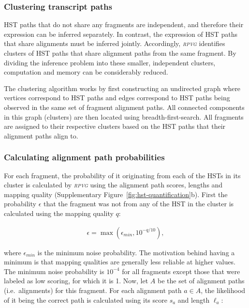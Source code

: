 \documentclass[11pt]{ucthesis}
\newcommand{\tool}[1]{\emph{\textsc{#1}}}
\begin{document}
\subsubsection{Clustering transcript paths}

HST paths that do not share any fragments are independent, and therefore their expression can be inferred separately. In contrast, the expression of HST paths that share alignments must be inferred jointly. Accordingly, \tool{rpvg} identifies clusters of HST paths that share alignment paths from the same fragment. By dividing the inference problem into these smaller, independent clusters, computation and memory can be considerably reduced. 

The clustering algorithm works by first constructing an undirected graph where vertices correspond to HST paths and edges correspond to HST paths being observed in the same set of fragment alignment paths. All connected components in this graph (clusters) are then located using breadth-first-search. All fragments are assigned to their respective clusters based on the HST paths that their alignment paths align to. 

\subsubsection{Calculating alignment path probabilities}

For each fragment, the probability of it originating from each of the HSTs in its cluster is calculated by \tool{rpvg} using the alignment path scores, lengths and mapping quality (Supplementary Figure~\ref{fig:hst-quantification}b). First the probability $\epsilon$ that the fragment was not from any of the HST in the cluster is calculated using the mapping quality $q$:

\begin{align}
    \epsilon=\max\left(\epsilon_{min}, 10^{-q/10}\right),
\end{align}

\noindent where $\epsilon_{min}$ is the minimum noise probability. The motivation behind having a minimum is that mapping qualities are generally less reliable at higher values. The minimum noise probability is $10^{-4}$ for all fragments except those that were labeled as low scoring, for which it is 1. 
Now, let $A$ be the set of alignment paths (i.e.\ alignments) for this fragment. For each alignment path ${a\in A}$, the likelihood of it being the correct path is calculated using its score $s_a$ and length $\ell_a$:
\end{document}
